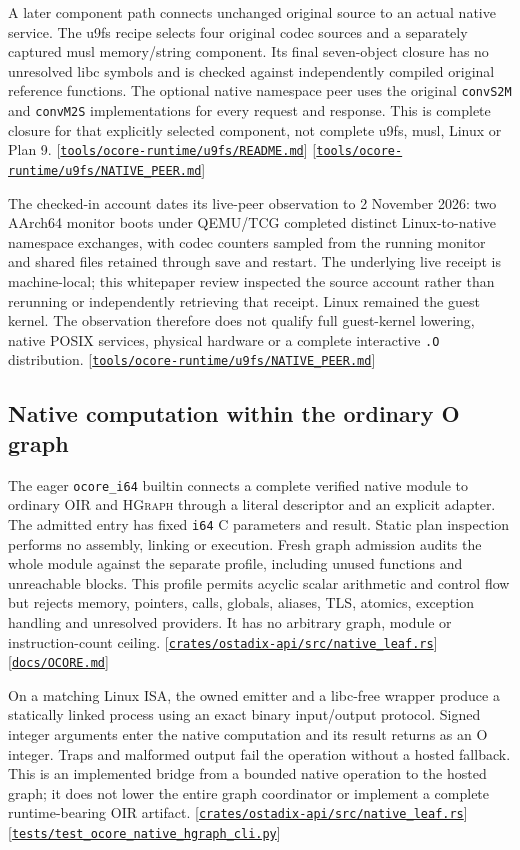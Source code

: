 \documentclass[11pt,oneside]{article}
\newcommand{\oir}{{\mdseries\textsc{OIR}}}
\newcommand{\hgraph}{{\mdseries\textsc{HGraph}}}
\newcommand{\src}[1]{\textcolor{OSlate}{\scriptsize[\href{https://github.com/lostadi/OSTADIX/blob/c0b02c326b2329a95ba52447c7180bc93957cd57/#1}{\nolinkurl{#1}}]}\allowbreak}
\newcommand{\breakcode}[1]{\texttt{\seqsplit{#1}}}
\begin{document}
A later component path connects unchanged original source to an actual
native service. The u9fs recipe selects four original codec sources and a
separately captured musl memory/string component. Its final seven-object
closure has no unresolved libc symbols and is checked against independently
compiled original reference functions. The optional native namespace peer
uses the original \texttt{convS2M} and \texttt{convM2S} implementations for
every request and response. This is complete closure for that explicitly
selected component, not complete u9fs, musl, Linux or Plan 9.
\src{tools/ocore-runtime/u9fs/README.md}
\src{tools/ocore-runtime/u9fs/NATIVE_PEER.md}

The checked-in account dates its live-peer observation to 2 November 2026:
two AArch64 monitor boots under QEMU/TCG completed distinct Linux-to-native
namespace exchanges, with codec counters sampled from the running monitor
and shared files retained through save and restart. The underlying live
receipt is machine-local; this whitepaper review inspected the source
account rather than rerunning or independently retrieving that receipt.
Linux remained the guest kernel. The observation therefore does not qualify
full guest-kernel lowering, native POSIX services, physical hardware or a
complete interactive \texttt{.O} distribution.
\src{tools/ocore-runtime/u9fs/NATIVE_PEER.md}

\subsection{Native computation within the ordinary O graph}

The eager \texttt{ocore\_i64} builtin connects a complete verified native module
to ordinary \oir{} and \hgraph{} through a literal descriptor and an explicit
adapter. The admitted entry has fixed \texttt{i64} C parameters and result.
Static plan inspection performs no assembly, linking or execution. Fresh graph
admission audits the whole module against the separate
\breakcode{linux-elf-i64-acyclic-v1} profile, including unused functions and
unreachable blocks. This profile permits acyclic scalar arithmetic and control
flow but rejects memory, pointers, calls, globals, aliases, TLS, atomics,
exception handling and unresolved providers. It has no arbitrary graph,
module or instruction-count ceiling.
\src{crates/ostadix-api/src/native_leaf.rs}
\src{docs/OCORE.md}

On a matching Linux ISA, the owned emitter and a libc-free wrapper produce a
statically linked process using an exact binary input/output protocol. Signed
integer arguments enter the native computation and its result returns as an
O integer. Traps and malformed output fail the operation without a hosted
fallback. This is an implemented bridge from a bounded native operation to
the hosted graph; it does not lower the entire graph coordinator or implement
a complete runtime-bearing OIR artifact.
\src{crates/ostadix-api/src/native_leaf.rs}
\src{tests/test_ocore_native_hgraph_cli.py}
\end{document}
